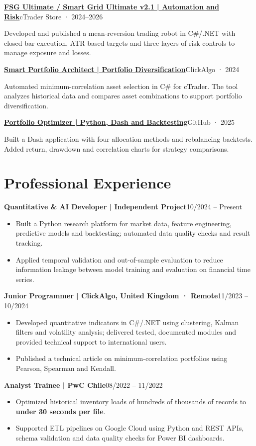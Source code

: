\documentclass[10pt,a4paper]{article}
\newcommand{\entry}[2]{\par\addvspace{3pt}\textbf{#1}\hfill{\fontsize{9.5}{11}\selectfont\color{muted}#2}\par\nopagebreak}
\newcommand{\project}[3]{\par\addvspace{3pt}\textbf{\href{#1}{#2}}\hfill{\fontsize{9.5}{11}\selectfont\color{muted}#3}\par\nopagebreak}
\begin{document}
\project{https://ctrader.com/products/438}{FSG Ultimate / Smart Grid Ultimate v2.1 | Automation and Risk}{cTrader Store · 2024--2026}
Developed and published a mean-reversion trading robot in C\#/.NET with closed-bar execution, ATR-based
targets and three layers of risk controls to manage exposure and losses.

\project{https://clickalgo.com/smart-portfolio-architect}{Smart Portfolio Architect | Portfolio Diversification}{ClickAlgo · 2024}
Automated minimum-correlation asset selection in C\# for cTrader. The tool analyzes historical data
and compares asset combinations to support portfolio diversification.

\project{https://github.com/walterm2482/portfolio-optimizer}{Portfolio Optimizer | Python, Dash and Backtesting}{GitHub · 2025}
Built a Dash application with four allocation methods and rebalancing backtests. Added return,
drawdown and correlation charts for strategy comparisons.

\section{Professional Experience}
\entry{Quantitative \& AI Developer | Independent Project}{10/2024 -- Present}
\begin{itemize}
  \item Built a Python research platform for market data, feature engineering, predictive models and
  backtesting; automated data quality checks and result tracking.
  \item Applied temporal validation and out-of-sample evaluation to reduce information leakage between
  model training and evaluation on financial time series.
\end{itemize}

\entry{Junior Programmer | ClickAlgo, United Kingdom · Remote}{11/2023 -- 10/2024}
\begin{itemize}
  \item Developed quantitative indicators in C\#/.NET using clustering, Kalman filters and volatility analysis;
  delivered tested, documented modules and provided technical support to international users.
  \item Published a technical article on minimum-correlation portfolios using Pearson, Spearman and Kendall.
\end{itemize}

\entry{Analyst Trainee | PwC Chile}{08/2022 -- 11/2022}
\begin{itemize}
  \item Optimized historical inventory loads of hundreds of thousands of records to
  \textbf{under 30 seconds per file}.
  \item Supported ETL pipelines on Google Cloud using Python and REST APIs, schema validation and
  data quality checks for Power BI dashboards.
\end{itemize}
\end{document}
